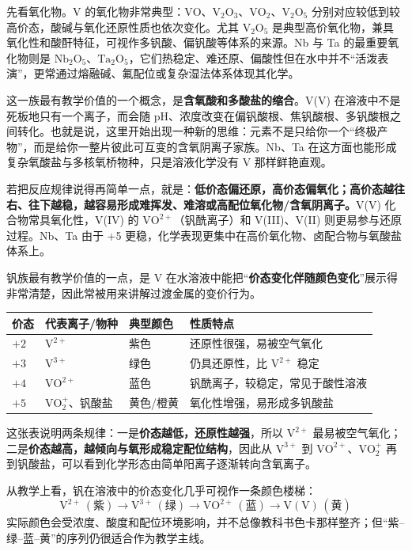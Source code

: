 \documentclass[UTF8]{ctexbook}
\begin{document}
先看氧化物。V 的氧化物非常典型：$\mathrm{VO}$、$\mathrm{V_2O_3}$、$\mathrm{VO_2}$、$\mathrm{V_2O_5}$ 分别对应较低到较高价态，酸碱与氧化还原性质也依次变化。尤其 $\mathrm{V_2O_5}$ 是典型高价氧化物，兼具氧化性和酸酐特征，可视作多钒酸、偏钒酸等体系的来源。Nb 与 Ta 的最重要氧化物则是 $\mathrm{Nb_2O_5}$、$\mathrm{Ta_2O_5}$，它们热稳定、难还原、偏酸性但在水中并不“活泼表演”，更常通过熔融碱、氟配位或复杂湿法体系体现其化学。

这一族最有教学价值的一个概念，是\textbf{含氧酸和多酸盐的缩合}。V(V) 在溶液中不是死板地只有一个离子，而会随 pH、浓度改变在偏钒酸根、焦钒酸根、多钒酸根之间转化。也就是说，这里开始出现一种新的思维：元素不是只给你一个“终极产物”，而是给你一整片彼此可互变的含氧阴离子家族。Nb、Ta 在这方面也能形成复杂氧酸盐与多核氧桥物种，只是溶液化学没有 V 那样鲜艳直观。

若把反应规律说得再简单一点，就是：\textbf{低价态偏还原，高价态偏氧化；高价态越往右、往下越稳，越容易形成难挥发、难溶或高配位氧化物/含氧阴离子。}V(V) 化合物常具氧化性，V(IV) 的 $\mathrm{VO^{2+}}$（钒酰离子）和 V(III)、V(II) 则更易参与还原过程。Nb、Ta 由于 +5 更稳，化学表现更集中在高价氧化物、卤配合物与氧酸盐体系上。

钒族最有教学价值的一点，是 V 在水溶液中能把“\textbf{价态变化伴随颜色变化}”展示得非常清楚，因此常被用来讲解过渡金属的变价行为。

\renewcommand{\arraystretch}{1.15}
\noindent\begin{tabular*}{\textwidth}{@{\extracolsep{\fill}}llll@{}}
\toprule
价态 & 代表离子/物种 & 典型颜色 & 性质特点 \\
\midrule
$+2$ & $\mathrm{V^{2+}}$ & 紫色 & 还原性很强，易被空气氧化 \\
$+3$ & $\mathrm{V^{3+}}$ & 绿色 & 仍具还原性，比 $\mathrm{V^{2+}}$ 稳定 \\
$+4$ & $\mathrm{VO^{2+}}$ & 蓝色 & 钒酰离子，较稳定，常见于酸性溶液 \\
$+5$ & $\mathrm{VO_2^{+}}$、钒酸盐 & 黄色/橙黄 & 氧化性增强，易形成多钒酸盐 \\
\bottomrule
\end{tabular*}
\renewcommand{\arraystretch}{1.0}

这张表说明两条规律：一是\textbf{价态越低，还原性越强}，所以 $\mathrm{V^{2+}}$ 最易被空气氧化；二是\textbf{价态越高，越倾向与氧形成稳定配位结构}，因此从 $\mathrm{V^{3+}}$ 到 $\mathrm{VO^{2+}}$、$\mathrm{VO_2^+}$ 再到钒酸盐，可以看到化学形态由简单阳离子逐渐转向含氧离子。

从教学上看，钒在溶液中的价态变化几乎可视作一条颜色楼梯：
\[
\mathrm{V^{2+}\,(紫) \rightarrow V^{3+}\,(绿) \rightarrow VO^{2+}\,(蓝) \rightarrow V(V)\,(黄)}
\]
实际颜色会受浓度、酸度和配位环境影响，并不总像教科书色卡那样整齐；但“紫--绿--蓝--黄”的序列仍很适合作为教学主线。
\end{document}
